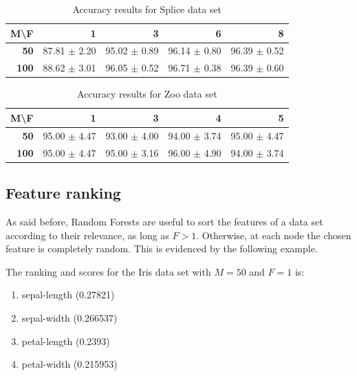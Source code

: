 \documentclass[journal, a4paper]{IEEEtran}
\begin{document}
\begin{table}[htbp]
\caption{Accuracy results for Splice data set}
\begin{center}
\begin{tabular}{|r|r|r|r|r|}
\hline
\textbf{M\textbackslash{}F} & \textbf{1} & \textbf{3} & \textbf{6} & \textbf{8} \\ \hline
\textbf{50} & 87.81 $ \pm $ 2.20 & 95.02 $ \pm $ 0.89 & 96.14 $ \pm $ 0.80 & 96.39 $ \pm $ 0.52 \\ \hline
\textbf{100} & 88.62 $ \pm $ 3.01 & 96.05 $ \pm $ 0.52 & 96.71 $ \pm $ 0.38 & 96.39 $ \pm $ 0.60 \\ \hline
\end{tabular}
\end{center}
\label{tab:acc-splice}
\end{table}

\begin{table}[htbp]
\caption{Accuracy results for Zoo data set}
\begin{center}
\begin{tabular}{|r|r|r|r|r|}
\hline
\textbf{M\textbackslash{}F} & \textbf{1} & \textbf{3} & \textbf{4} & \textbf{5} \\ \hline
\textbf{50} & 95.00 $ \pm $ 4.47 & 93.00 $ \pm $ 4.00 & 94.00 $ \pm $ 3.74 & 95.00 $ \pm $ 4.47 \\ \hline
\textbf{100} & 95.00 $ \pm $ 4.47 & 95.00 $ \pm $ 3.16 & 96.00 $ \pm $ 4.90 & 94.00 $ \pm $ 3.74 \\ \hline
\end{tabular}
\end{center}
\label{tab:acc-zoo}
\end{table}

\subsection{Feature ranking}

As said before, Random Forests are useful to sort the features of a data set according
to their relevance, as long as $ F > 1 $. Otherwise, at each node the chosen feature is
completely random. This is evidenced by the following example.

The ranking and scores for the Iris data set with $ M = 50 $ and $ F = 1 $ is:
\begin{enumerate}
\item sepal-length (0.27821)
\item sepal-width (0.266537)
\item petal-length (0.2393)
\item petal-width (0.215953)
\end{enumerate}
\end{document}
